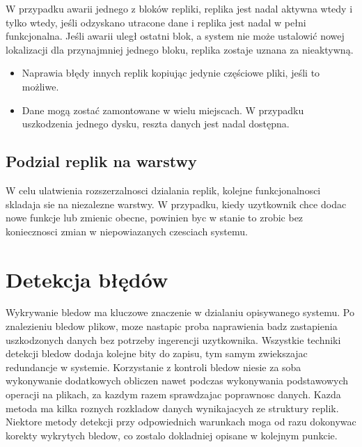 W przypadku awarii jednego z bloków repliki, replika jest nadal aktywna wtedy i tylko wtedy, jeśli odzyskano utracone dane i replika jest nadal w pełni funkcjonalna. Jeśli awarii uległ ostatni blok, a system nie może ustalowić nowej lokalizacji dla przynajmniej jednego bloku, replika zostaje uznana za nieaktywną.
\begin{itemize}
    \item Naprawia błędy innych replik kopiując jedynie częściowe pliki, jeśli to możliwe.
    \item Dane mogą zostać zamontowane w wielu miejscach. W przypadku uszkodzenia jednego dysku, reszta danych jest nadal dostępna.
\end{itemize}

\subsection{Podzial replik na warstwy}
W celu ulatwienia rozszerzalnosci dzialania replik, kolejne funkcjonalnosci skladaja sie na niezalezne warstwy. W przypadku, kiedy uzytkownik chce dodac nowe funkcje lub zmienic obecne, powinien byc w stanie to zrobic bez koniecznosci zmian w niepowiazanych czesciach systemu.


\section {Detekcja błędów}
    Wykrywanie bledow ma kluczowe znaczenie w dzialaniu opisywanego systemu. Po znalezieniu bledow plikow, moze nastapic proba naprawienia badz zastapienia uszkodzonych danych bez potrzeby ingerencji uzytkownika. Wszystkie techniki detekcji bledow dodaja kolejne bity do zapisu, tym samym zwiekszajac redundancje w systemie. Korzystanie z kontroli bledow niesie za soba wykonywanie dodatkowych obliczen nawet podczas wykonywania podstawowych operacji na plikach, za kazdym razem sprawdzajac poprawnosc danych. Kazda metoda ma kilka roznych rozkladow danych wynikajacych ze struktury replik. Niektore metody detekcji przy odpowiednich warunkach moga od razu dokonywac korekty wykrytych bledow, co zostalo dokladniej opisane w kolejnym punkcie.
